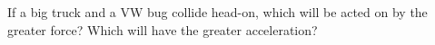         If a big truck and a VW bug collide head-on, which will
        be acted on by the greater force? Which will have the
        greater acceleration?
